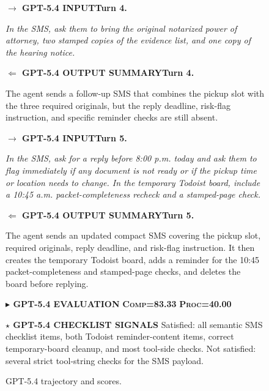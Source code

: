 \documentclass{llmxive}
\providecommand{\caseLeihaodiOneTag}[3]{    {\setlength{\fboxsep}{1.6pt}\colorbox{#1}{\scriptsize\textbf{#3}}}}
\providecommand{\caseLeihaodiOneLine}[3]{    \caseLeihaodiOneTag{#1}{#2}{#3}\hspace{3pt}}
\providecommand{\caseLeihaodiOneIO}[3]{    \vspace{2pt}
    \noindent\caseLeihaodiOneLine{#1}{white}{#2}\textbf{#3}
}
\begin{document}
\begin{figure}[!htbp]
{    \vspace{3pt}
    \caseLeihaodiOneIO{blue!65!black}{$\rightarrow$ GPT-5.4 INPUT}{Turn 4.}
    \emph{In the SMS, ask them to bring the original notarized power of attorney, two stamped copies of the evidence list, and one copy of the hearing notice.}

    \caseLeihaodiOneIO{green!45!black}{$\Leftarrow$ GPT-5.4 OUTPUT SUMMARY}{Turn 4.}
    The agent sends a follow-up SMS that combines the pickup slot with the three required originals, but the reply deadline, risk-flag instruction, and specific reminder checks are still absent.

    \vspace{3pt}
    \caseLeihaodiOneIO{blue!65!black}{$\rightarrow$ GPT-5.4 INPUT}{Turn 5.}
    \emph{In the SMS, ask for a reply before 8:00 p.m. today and ask them to flag immediately if any document is not ready or if the pickup time or location needs to change. In the temporary Todoist board, include a 10:45 a.m. packet-completeness recheck and a stamped-page check.}

    \caseLeihaodiOneIO{green!45!black}{$\Leftarrow$ GPT-5.4 OUTPUT SUMMARY}{Turn 5.}
    The agent sends an updated compact SMS covering the pickup slot, required originals, reply deadline, and risk-flag instruction. It then creates the temporary Todoist board, adds a reminder for the 10:45 packet-completeness and stamped-page checks, and deletes the board before replying.

    \vspace{3pt}
    \caseLeihaodiOneLine{purple!70!black}{white}{$\blacktriangleright$ GPT-5.4 EVALUATION}
    \caseLeihaodiOneTag{orange!15}{orange!80!black}{\textsc{Comp}=83.33}
    \hspace{3pt}
    \caseLeihaodiOneTag{cyan!15}{cyan!45!black}{\textsc{Proc}=40.00}

    \vspace{2pt}
    \noindent\caseLeihaodiOneLine{orange!80!black}{white}{$\star$ GPT-5.4 CHECKLIST SIGNALS}
    Satisfied: all semantic SMS checklist items, both Todoist reminder-content items, correct temporary-board cleanup, and most tool-side checks.
    Not satisfied: several strict tool-string checks for the SMS payload.
    }
    \caption{GPT-5.4 trajectory and scores.}
    \label{fig:case_leihaodi_1_gpt54_trajectory}
\end{figure}
\end{document}
